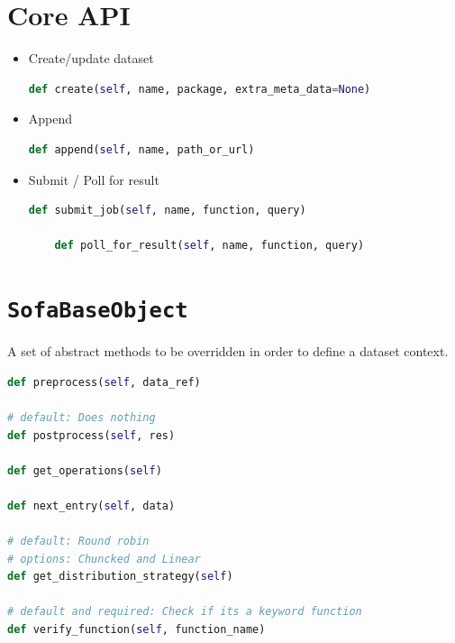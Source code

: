 \documentclass[paper=128mm:96mm, fontsize=11pt, pagesize, parskip=half-,]{scrartcl}
\theoremstyle{definition}
\newcommand*{\newslide}{\clearpage}
\begin{document}
\section{Core API}
\begin{itemize}
	\item Create/update dataset
	\begin{lstlisting}[language=Python, basicstyle=\ttfamily\tiny, numbers=none]
	def create(self, name, package, extra_meta_data=None)
	\end{lstlisting}
	\vspace*{-5mm}
	\item Append
	\begin{lstlisting}[language=Python, basicstyle=\ttfamily\tiny, numbers=none]
	def append(self, name, path_or_url)
	\end{lstlisting}
	\vspace*{-5mm}	
	\item Submit / Poll for result
	\begin{lstlisting}[language=Python, basicstyle=\ttfamily\tiny, numbers=none]
	def submit_job(self, name, function, query)
	
	def poll_for_result(self, name, function, query)
	\end{lstlisting}
\end{itemize}
\newslide

\section{\texttt{SofaBaseObject}}
A set of abstract methods to be overridden in order to define a dataset context.

\begin{lstlisting}[language=Python, basicstyle=\ttfamily\tiny, numbers=none]
def preprocess(self, data_ref)

# default: Does nothing
def postprocess(self, res)

def get_operations(self)

def next_entry(self, data)

# default: Round robin
# options: Chuncked and Linear
def get_distribution_strategy(self)

# default and required: Check if its a keyword function
def verify_function(self, function_name)
\end{lstlisting}
\newslide
\end{document}
